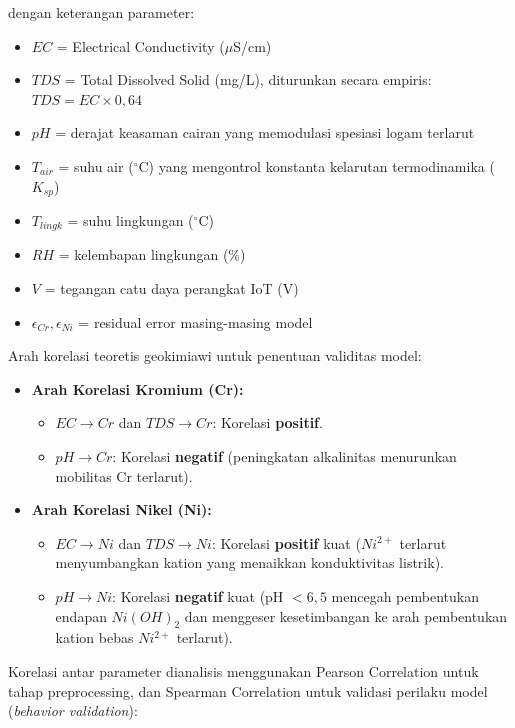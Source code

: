 \documentclass[12pt,a4paper]{article}
\begin{document}
dengan keterangan parameter:
\begin{itemize}
    \item $EC$ = Electrical Conductivity ($\mu$S/cm)
    \item $TDS$ = Total Dissolved Solid (mg/L), diturunkan secara empiris: $TDS = EC \times 0{,}64$
    \item $pH$ = derajat keasaman cairan yang memodulasi spesiasi logam terlarut
    \item $T_{air}$ = suhu air ($^{\circ}$C) yang mengontrol konstanta kelarutan termodinamika ($K_{sp}$)
    \item $T_{lingk}$ = suhu lingkungan ($^{\circ}$C)
    \item $RH$ = kelembapan lingkungan (\%)
    \item $V$ = tegangan catu daya perangkat IoT (V)
    \item $\epsilon_{Cr}, \epsilon_{Ni}$ = residual error masing-masing model
\end{itemize}

Arah korelasi teoretis geokimiawi untuk penentuan validitas model:
\begin{itemize}
    \item \textbf{Arah Korelasi Kromium (Cr):}
    \begin{itemize}
        \item $EC \rightarrow Cr$ dan $TDS \rightarrow Cr$: Korelasi \textbf{positif}.
        \item $pH \rightarrow Cr$: Korelasi \textbf{negatif} (peningkatan alkalinitas menurunkan mobilitas Cr terlarut).
    \end{itemize}
    \item \textbf{Arah Korelasi Nikel (Ni):}
    \begin{itemize}
        \item $EC \rightarrow Ni$ dan $TDS \rightarrow Ni$: Korelasi \textbf{positif} kuat ($Ni^{2+}$ terlarut menyumbangkan kation yang menaikkan konduktivitas listrik).
        \item $pH \rightarrow Ni$: Korelasi \textbf{negatif} kuat (pH $< 6{,}5$ mencegah pembentukan endapan $Ni(OH)_2$ dan menggeser kesetimbangan ke arah pembentukan kation bebas $Ni^{2+}$ terlarut).
    \end{itemize}
\end{itemize}

Korelasi antar parameter dianalisis menggunakan Pearson Correlation untuk tahap preprocessing, dan Spearman Correlation untuk validasi perilaku model (\textit{behavior validation}):
\end{document}
